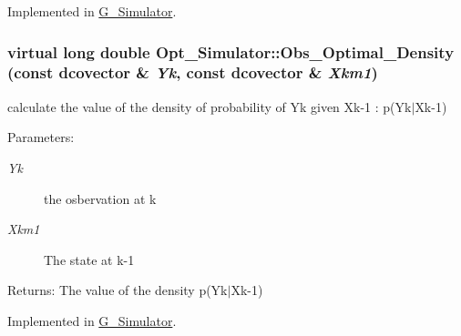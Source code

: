 Implemented in \hyperlink{class_g___simulator_b6c78e1dfa62c8c684b860ea1918f045}{G\_\-Simulator}.\hypertarget{class_opt___simulator_e72d4709998087317635a94c709d71ba}{
\subsubsection[{Obs\_\-Optimal\_\-Density}]{\setlength{\rightskip}{0pt plus 5cm}virtual long double Opt\_\-Simulator::Obs\_\-Optimal\_\-Density (const dcovector \& {\em Yk}, \/  const dcovector \& {\em Xkm1})}}
\label{class_opt___simulator_e72d4709998087317635a94c709d71ba}


calculate the value of the density of probability of Yk given Xk-1 : p(Yk$|$Xk-1) 

\begin{Desc}
\item[Parameters:]
\begin{description}
\item[{\em Yk}]the osbervation at k \item[{\em Xkm1}]The state at k-1\end{description}
\end{Desc}
\begin{Desc}
\item[Returns:]The value of the density p(Yk$|$Xk-1) \end{Desc}


Implemented in \hyperlink{class_g___simulator_192df25d6edac87bf4aeb2d2f55d1c5c}{G\_\-Simulator}.
